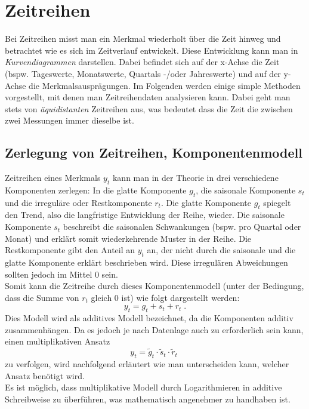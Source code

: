 \documentclass[a4paper]{article}
\newcommand\dangersign{%
 \makebox[1.8em][c]{%
 \makebox[0pt][c]{\raisebox{.15em}{\small!}}%
 \makebox[0pt][c]{\color{red}\Large$\triangle$}}}%
\begin{document}
\clearpage


\section{Zeitreihen}
Bei Zeitreihen misst man ein Merkmal wiederholt über die Zeit hinweg und betrachtet wie es sich im Zeitverlauf entwickelt. Diese Entwicklung kann man in \textit{Kurvendiagrammen} darstellen. Dabei befindet sich auf der x-Achse die Zeit (bspw. Tageswerte, Monatswerte, Quartals -/oder Jahreswerte) und auf der y-Achse die Merkmalsausprägungen. Im Folgenden werden einige simple Methoden vorgestellt, mit denen man Zeitreihendaten analysieren kann. Dabei geht man stets von \textit{äquidistanten} Zeitreihen aus, was bedeutet dass die Zeit die zwischen zwei Messungen immer dieselbe ist.

\subsection{Zerlegung von Zeitreihen, Komponentenmodell}
Zeitreihen eines Merkmals $y_t$ kann man in der Theorie in drei verschiedene Komponenten zerlegen: In die glatte Komponente $g_t$, die saisonale Komponente $s_t$ und die irreguläre oder Restkomponente $r_t$. Die glatte Komponente $g_t$ spiegelt den Trend, also die langfristige Entwicklung der Reihe, wieder. Die saisonale Komponente $s_t$ beschreibt die saisonalen Schwankungen (bspw. pro Quartal oder Monat) und erklärt somit wiederkehrende Muster in der Reihe. Die Restkomponente gibt den Anteil an $y_t$ an, der nicht durch die saisonale und die glatte Komponente erklärt beschrieben wird. Diese irregulären Abweichungen sollten jedoch im Mittel 0 sein.\\
Somit kann die Zeitreihe durch dieses Komponentenmodell (unter der Bedingung, dass die Summe von $r_t$ gleich 0 ist) wie folgt dargestellt werden: 
$$y_t=g_t+s_t+r_t\;.$$
\noindent Dies Modell wird als additives Modell bezeichnet, da die Komponenten additiv zusammenhängen. Da es jedoch je nach Datenlage auch zu erforderlich sein kann, einen multiplikativen Ansatz
$$y_t = \tilde g_t \cdot \tilde s_t \cdot \tilde r_t\;$$
zu verfolgen, wird nachfolgend erläutert wie man unterscheiden kann, welcher Ansatz benötigt wird.\\

\noindent \dangersign Es ist möglich, dass multiplikative Modell durch Logarithmieren in additive Schreibweise zu überführen, was mathematisch angenehmer zu handhaben ist.\\
\end{document}
